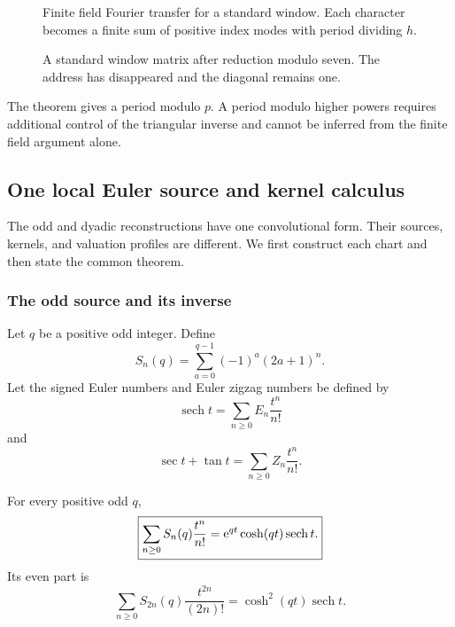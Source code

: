 \begin{figure}[t]
\centering
{}
\caption{Finite field Fourier transfer for a standard window. Each character becomes a finite sum of positive index modes with period dividing \(h\).}
\label{hist:fig:standard_fourier}
\end{figure}
\begin{figure}[t]
\centering
{}
\caption{A standard window matrix after reduction modulo seven. The address has disappeared and the diagonal remains one.}
\label{hist:fig:standard_matrix}
\end{figure}

\begin{histremark}\label{hist:rem:period_boundary}
The theorem gives a period modulo \(p\). A period modulo higher powers requires additional control of the triangular inverse and cannot be inferred from the finite field argument alone.

\end{histremark}

\subsection{One local Euler source and kernel calculus}\label{hist:sec:local_euler}

The odd and dyadic reconstructions have one convolutional form. Their sources, kernels, and valuation profiles are different. We first construct each chart and then state the common theorem.

\subsubsection{The odd source and its inverse}

Let \(q\) be a positive odd integer. Define
\[
S_n(q)
=
\sum_{a=0}^{q-1}
(-1)^a(2a+1)^n.
\]
Let the signed Euler numbers and Euler zigzag numbers be defined by
\[
\operatorname{sech}t
=
\sum_{n\geq0}E_n\frac{t^n}{n!}
\]
and
\[
\sec t+\tan t
=
\sum_{n\geq0}Z_n\frac{t^n}{n!}.
\]

\begin{histlemma}\label{hist:lem:odd_source_egf}
For every positive odd \(q\),
\[
\boxed{
\sum_{n\geq0}S_n(q)\frac{t^n}{n!}
=
\mathrm e^{qt}\cosh(qt)\operatorname{sech}t.
}
\]
Its even part is
\[
\boxed{
\sum_{n\geq0}S_{2n}(q)\frac{t^{2n}}{(2n)!}
=
\cosh^2(qt)\operatorname{sech}t.
}
\]
\end{histlemma}

